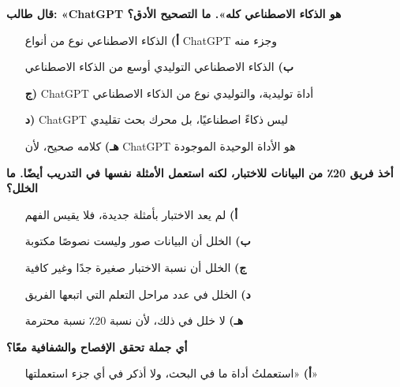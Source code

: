 \documentclass[11pt,a4paper]{article}
\begin{document}
\begin{multicols}{2}
\begin{minipage}{\linewidth}
\hangindent=0.7cm\textbf{قال طالب: «\textenglish{ChatGPT} هو الذكاء الاصطناعي كله». ما التصحيح الأدق؟}
\begin{itemize}[leftmargin=0.95cm, labelsep=4pt, itemsep=0pt, topsep=2pt, parsep=0pt]
  \item[\textbf{أ)}] الذكاء الاصطناعي نوع من أنواع \textenglish{ChatGPT} وجزء منه
  \item[\textbf{ب)}] الذكاء الاصطناعي التوليدي أوسع من الذكاء الاصطناعي
  \item[\textbf{ج)}] \textenglish{ChatGPT} أداة توليدية، والتوليدي نوع من الذكاء الاصطناعي
  \item[\textbf{د)}] \textenglish{ChatGPT} ليس ذكاءً اصطناعيًا، بل محرك بحث تقليدي
  \item[\textbf{هـ)}] كلامه صحيح، لأن \textenglish{ChatGPT} هو الأداة الوحيدة الموجودة
\end{itemize}
\end{minipage}\par\vspace{7pt plus 4pt}
\noindent\begin{minipage}{\linewidth}
\hangindent=0.7cm\textbf{أخذ فريق 20٪ من البيانات للاختبار، لكنه استعمل الأمثلة نفسها في التدريب أيضًا. ما الخلل؟}
\begin{itemize}[leftmargin=0.95cm, labelsep=4pt, itemsep=0pt, topsep=2pt, parsep=0pt]
  \item[\textbf{أ)}] لم يعد الاختبار بأمثلة جديدة، فلا يقيس الفهم
  \item[\textbf{ب)}] الخلل أن البيانات صور وليست نصوصًا مكتوبة
  \item[\textbf{ج)}] الخلل أن نسبة الاختبار صغيرة جدًا وغير كافية
  \item[\textbf{د)}] الخلل في عدد مراحل التعلم التي اتبعها الفريق
  \item[\textbf{هـ)}] لا خلل في ذلك، لأن نسبة 20٪ نسبة محترمة
\end{itemize}
\end{minipage}\par\vspace{7pt plus 4pt}
\noindent\begin{minipage}{\linewidth}
\hangindent=0.7cm\textbf{أي جملة تحقق الإفصاح والشفافية معًا؟}
\begin{itemize}[leftmargin=0.95cm, labelsep=4pt, itemsep=0pt, topsep=2pt, parsep=0pt]
  \item[\textbf{أ)}] «استعملتُ أداة ما في البحث، ولا أذكر في أي جزء استعملتها»

\end{itemize}
\end{minipage}
\end{multicols}
\end{document}
